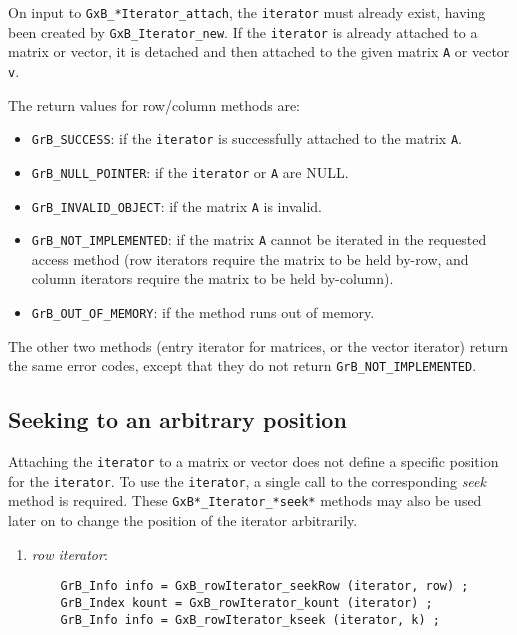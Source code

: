 \documentclass[12pt]{article}
\begin{document}
{On input to \verb'GxB_*Iterator_attach', the \verb'iterator' must already
exist, having been created by \verb'GxB_Iterator_new'.  If the \verb'iterator'
is already attached to a matrix or vector, it is detached and then attached to
the given matrix \verb'A' or vector \verb'v'.

The return values for row/column methods are:

    \begin{itemize}
    \item
    \verb'GrB_SUCCESS':         if the \verb'iterator' is successfully
        attached to the matrix \verb'A'.
    \item
    \verb'GrB_NULL_POINTER':    if the \verb'iterator' or \verb'A' are NULL.
    \item
    \verb'GrB_INVALID_OBJECT':  if the matrix \verb'A' is invalid.
    \item
    \verb'GrB_NOT_IMPLEMENTED': if the matrix \verb'A' cannot be iterated
        in the requested access method (row iterators require the matrix to
        be held by-row, and column iterators require the matrix to be held
        by-column).
    \item
    \verb'GrB_OUT_OF_MEMORY':   if the method runs out of memory.
    \end{itemize}

The other two methods (entry iterator for matrices, or the vector iterator)
return the same error codes, except that they
do not return \verb'GrB_NOT_IMPLEMENTED'.

\subsection{Seeking to an arbitrary position}

Attaching the \verb'iterator' to a matrix or vector does not define a specific
position for the \verb'iterator'.  To use the \verb'iterator', a single call to
the corresponding {\em seek} method is required.  These
\verb'GxB*_Iterator_*seek*' methods may also be used later on to change the
position of the iterator arbitrarily.

    \begin{enumerate}
    \item {\em row iterator}: 
    {\footnotesize
    \begin{verbatim}
    GrB_Info info = GxB_rowIterator_seekRow (iterator, row) ;
    GrB_Index kount = GxB_rowIterator_kount (iterator) ;
    GrB_Info info = GxB_rowIterator_kseek (iterator, k) ; \end{verbatim}}


\end{enumerate}}
\end{document}
